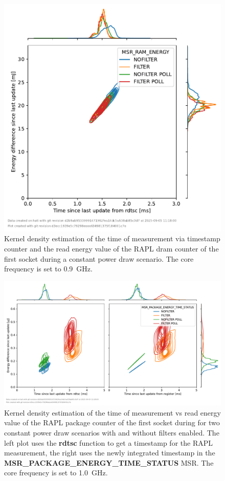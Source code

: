 \begin{figure}[]
    \centering
    \includegraphics[width=0.54\columnwidth]{fig/rapl-update-intervals/MSR_RAM_ENERGY_900000.pdf}
    \caption{Kernel density estimation of the time of measurement via timestamp counter and the read energy value of the RAPL dram counter of the first socket during a constant power draw scenario.
    The core frequency is set to \SI{0.9}{\GHz}.}
\end{figure}

\clearpage
\begin{figure}[]
    \centering
    \includegraphics[width=\columnwidth]{fig/rapl-update-intervals/MSR_PACKAGE_ENERGY_TIME_STATUS_1000000.pdf}
    \caption{Kernel density estimation of the time of measurement vs read energy value of the RAPL package counter of the first socket during for two constant power draw scenarios with and without filters enabled.
    The left plot uses the \textbf{rdtsc} function to get a timestamp for the RAPL measurement, the right uses the newly integrated timestamp in the \textbf{MSR\_PACKAGE\_ENERGY\_TIME\_STATUS} MSR.
    The core frequency is set to \SI{1.0}{\GHz}.}
\end{figure}

